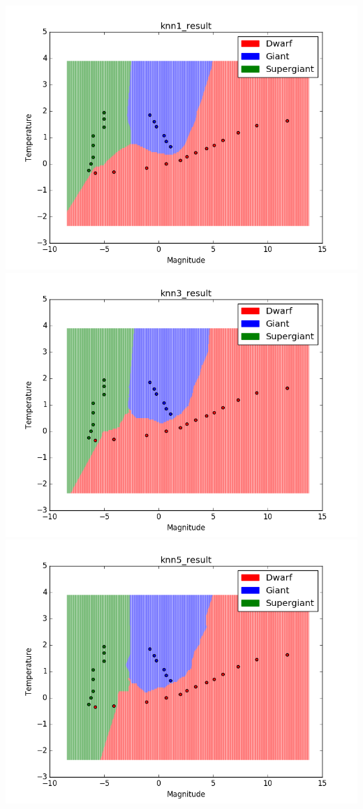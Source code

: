 \documentclass[submit]{harvardml}
\begin{document}
\begin{enumerate}
    \includegraphics[scale=.40]{hw2/P3_Pics/figure_1-4.png}
    \includegraphics[scale=.40]{hw2/P3_Pics/figure_1-5.png}
    \includegraphics[scale=.40]{hw2/P3_Pics/figure_1-6.png}

\end{enumerate}
\end{document}
